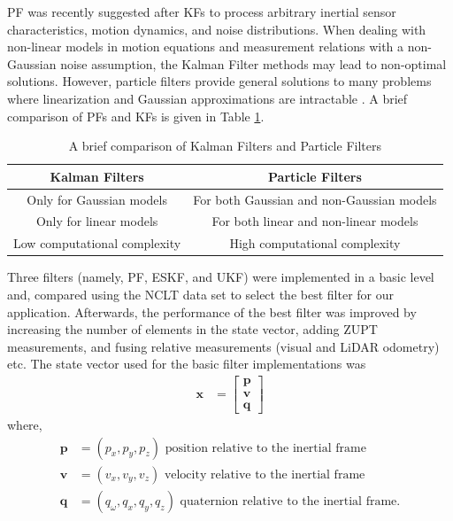 \gls{PF} was recently suggested after \gls{KF}s to process arbitrary inertial sensor characteristics, motion dynamics, and noise distributions. When dealing with non-linear models in motion equations and measurement relations with a non-Gaussian noise assumption, the Kalman Filter methods may lead to non-optimal solutions. However, particle filters provide general solutions to many problems where linearization and Gaussian approximations are intractable \cite{ch27:ababsa2004comparison}. A brief comparison of \gls{PF}s and \gls{KF}s is given in Table \ref{table:ch:KFandPFComparison}.
\begin{table}[h]
\centering
	\begin{tabular}{|c|c|} 
		\hline
		\textbf{Kalman Filters} & \textbf{Particle Filters} \\
		\hline
		Only for Gaussian models & For both Gaussian and non-Gaussian models\\
		\hline
		Only for linear models& For both linear and non-linear models
		\\
		\hline
		Low computational complexity&High computational complexity\\
		\hline
	\end{tabular}
	\caption{A brief comparison of Kalman Filters and Particle Filters}
	\label{table:ch:KFandPFComparison}
	\vspace{0.5cm}
\end{table}

Three filters (namely, \gls{PF}, \gls{ESKF}, and \gls{UKF}) were implemented in a basic level and, compared using the \gls{NCLT} data set to select the best filter for our application. Afterwards, the performance of the  best filter was improved by increasing the number of elements in the state vector, adding \gls{ZUPT} measurements, and fusing relative measurements (visual and \gls{LiDAR} odometry) etc. The state vector used for the basic filter implementations was
\begin{align}
\label{eq:ch:basicStateVector}
   \textbf{x} &= \left[\begin{matrix}{}\textbf{p}\\\textbf{v}\\\textbf{q}\end{matrix}\right]
\end{align}
where,
\begin{align}
	\textbf{p}&=(p_x,p_y,p_z) \text{ position relative to the inertial frame}\\
	\textbf{v}&=(v_x,v_y,v_z) \text{ velocity relative to the inertial frame}\\
	\textbf{q}&=(q_\omega,q_x,q_y,q_z) \text{ quaternion relative to the inertial frame}.
\end{align}

